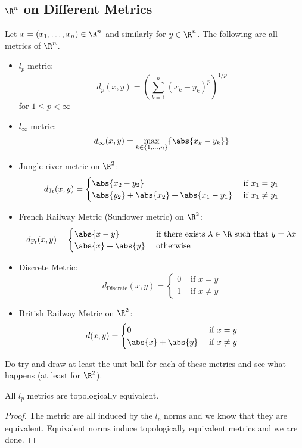 \documentclass[a4paper]{article}
\begin{document}
\subsection{$\R^n$ on Different Metrics}
\begin{thm}{}{} Let $x=(x_1,\dots,x_n)\in\R^n$ and similarly for $y\in\R^n$. The following are all metrics of $\R^n$. 
\begin{itemize}
\item $l_p$ metric: $$d_p(x,y)=\left(\sum_{k=1}^n(x_k-y_k)^p\right)^{1/p}$$ for $1\leq p<\infty$
\item $l_\infty$ metric: $$d_{\infty}(x,y)=\max_{k\in\{1,\dots,n\}}\{\abs{x_k-y_k}\}$$
\item Jungle river metric on $\R^2$: $$d_{\text{Jr}}(x,y)=\begin{cases}
\abs{x_2-y_2} & \text{ if }x_1=y_1\\
\abs{y_2}+\abs{x_2}+\abs{x_1-y_1} & \text{ if }x_1\neq y_1
\end{cases}$$
\item French Railway Metric (Sunflower metric) on $\R^2$: $$d_{\text{Fr}}(x,y)=\begin{cases}
\abs{x-y} & \text{ if there exists $\lambda\in\R$ such that } y=\lambda x\\
\abs{x}+\abs{y} & \text{ otherwise }
\end{cases}$$
\item Discrete Metric: $$d_{\text{Discrete}}(x,y)=\begin{cases}
0 & \text{ if } x=y\\
1 & \text{ if } x\neq y
\end{cases}$$
\item British Railway Metric on $\R^2$: $$d(x,y)=\begin{cases}
0 & \text{ if } x=y\\
\abs{x}+\abs{y} & \text{ if } x\neq y
\end{cases}$$
\end{itemize}
\end{thm}

Do try and draw at least the unit ball for each of these metrics and see what happens (at least for $\R^2$). 

\begin{prp}{}{} All $l_p$ metrics are topologically equivalent. \tcbline
\begin{proof}
The metric are all induced by the $l_p$ norms and we know that they are equivalent. Equivalent norms induce topologically equivalent metrics and we are done. 
\end{proof}
\end{prp}
\end{document}
